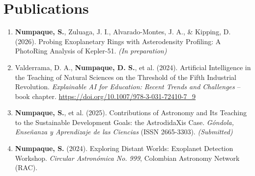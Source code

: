 \section*{Publications}
\begin{enumerate}
    \item \textbf{Numpaque, S.}, Zuluaga, J. I., Alvarado-Montes, J. A., \& Kipping, D. (2026). Probing Exoplanetary Rings with Asterodensity Profiling: A PhotoRing Analysis of Kepler-51. \textit{(In preparation)}
    \item Valderrama, D. A., \textbf{Numpaque, D. S.}, et al. (2024). Artificial Intelligence in the Teaching of Natural Sciences on the Threshold of the Fifth Industrial Revolution. \textit{Explainable AI for Education: Recent Trends and Challenges} -- book chapter. \url{https://doi.org/10.1007/978-3-031-72410-7_9}
    \item \textbf{Numpaque, S.}, et al. (2025). Contributions of Astronomy and Its Teaching to the Sustainable Development Goals: the AstrodidaXis Case. \textit{Góndola, Enseñanza y Aprendizaje de las Ciencias} (ISSN 2665-3303). \textit{(Submitted)}
    \item \textbf{Numpaque, S.} (2024). Exploring Distant Worlds: Exoplanet Detection Workshop. \textit{Circular Astronómica No. 999}, Colombian Astronomy Network (RAC).
\end{enumerate}
